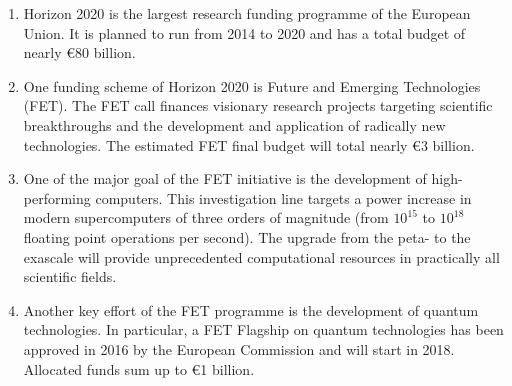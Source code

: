 \begin{enumerate}
 \item Horizon 2020 is the largest research funding programme of the European Union. It is planned to run from 2014 to 2020 and has a total budget of nearly \euro 80 billion. 
 \item One funding scheme of Horizon 2020 is Future and Emerging Technologies (FET). The FET call finances visionary research projects targeting scientific breakthroughs and the development and application of radically new technologies. The estimated FET final budget will total nearly \euro 3 billion. 
 \item One of the major goal of the FET initiative is the development of high-performing computers. This investigation line targets a power increase in modern supercomputers of three orders of magnitude (from $10^{15}$ to $10^{18}$ floating point operations per second). The upgrade from the peta- to the exascale will provide unprecedented computational resources in practically all scientific fields.
 \item Another key effort of the FET programme is the development of quantum technologies. In particular, a FET Flagship on quantum technologies has been approved in 2016 by the European Commission and will start in 2018. Allocated funds sum up to \euro 1 billion.    
\end{enumerate}